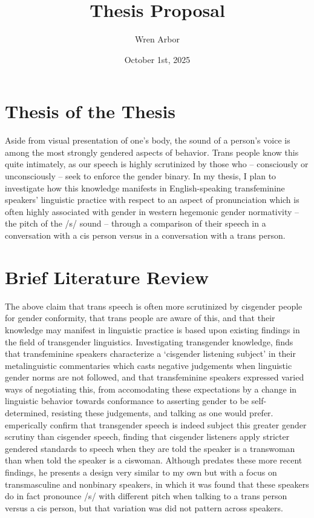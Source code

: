 \documentclass[11pt]{article}
\title{Thesis Proposal}
\author{Wren Arbor}
\date{October 1st, 2025}
\begin{document}
\maketitle

\section{Thesis of the Thesis}
Aside from visual presentation of one's body, the sound of a person's voice is among the most strongly gendered aspects of behavior. Trans people know this quite intimately, as our speech is highly scrutinized by those who --  consciously or unconsciously -- seek to enforce the gender binary. In my thesis, I plan to investigate how this knowledge manifests in English-speaking transfeminine speakers' linguistic practice with respect to an aspect of pronunciation which is often highly associated with gender in western hegemonic gender normativity -- the pitch of the /s/ sound -- through a comparison of their speech in a conversation with a cis person versus in a conversation with a trans person.

\section{Brief Literature Review}

The above claim that trans speech is often more scrutinized by cisgender people for gender conformity, that trans people are aware of this, and that their knowledge may manifest in linguistic practice is based upon existing findings in the field of transgender linguistics. Investigating transgender knowledge, \textcite{heffernan_constructing_2023} finds that transfeminine speakers characterize a `cisgender listening subject' in their metalinguistic commentaries which casts negative judgements when linguistic gender norms are not followed, and that transfeminine speakers expressed varied ways of negotiating this, from accomodating these expectations by a change in linguistic behavior towards conformance to asserting gender to be self-determined, resisting these judgements, and talking as one would prefer.  \textcite{jessee_cisgender_2025} emperically confirm that transgender speech is indeed subject this greater gender scrutiny than cisgender speech, finding that cisgender listeners apply stricter gendered standards to speech when they are told the speaker is a transwoman than when told the speaker is a ciswoman. Although \textcite{parnell-mooney_transgender_2019} predates these more recent findings, he presents a design very similar to my own but with a focus on transmasculine and nonbinary speakers, in which it was found that these speakers do in fact pronounce /s/ with different pitch when talking to a trans person versus a cis person, but that variation was did not pattern across speakers.  
\end{document}
